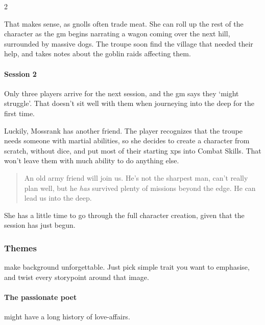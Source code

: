 \begin{multicols}{2}
\begin{exampletext}
  That makes sense, as gnolls often trade meat.
  She can roll up the rest of the character as the \gls{gm} begins narrating a wagon coming over the next hill, surrounded by massive dogs.
  The troupe soon find the \gls{village} that needed their help, and takes notes about the goblin raids affecting them.

\end{exampletext}

\begin{exampletext}
  \paragraph{Session 2}
  Only three players arrive for the next session, and the \gls{gm} says they `might struggle'.
  That doesn't sit well with them when journeying into the \gls{deep} for the first time.

  Luckily, Mossrank has another friend.
  The player recognizes that the troupe needs someone with martial abilities, so she decides to create a character from scratch, without dice, and put most of their starting \glspl{xp} into Combat Skills.
  That won't leave them with much ability to do anything else.

  \begin{quotation}
    An old army friend will join us.
    He's not the sharpest man, can't really plan well, but he \emph{has} survived plenty of missions beyond the \gls{edge}.
    He can lead us into the \gls{deep}.
  \end{quotation}

  She has a little time to go through the full character creation, given that the session has just begun.
\end{exampletext}

\subsubsection{Themes}
make  background unforgettable.
Just pick simple trait you want to emphasise, and twist every \gls{storypoint} around that image.

\paragraph{The passionate poet}
might have a long history of love-affairs.


\end{multicols}
